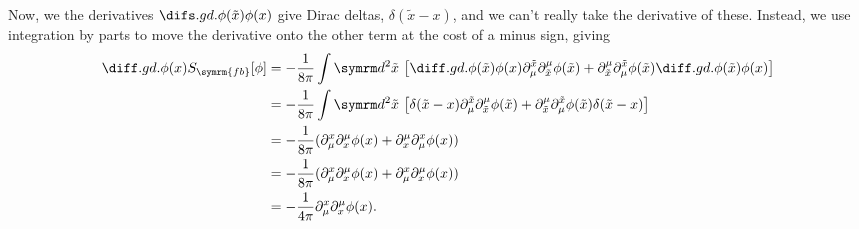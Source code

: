 \documentclass[fleqn]{NotesClass}
\renewcommand{\dl}[1]{\symrm{d}#1}
\newcommand{\freeboson}{\symrm{fb}}
\begin{document}
    Now, we the derivatives \(\difsd{\phi(\tilde{x})}{\phi(x)}\) give Dirac deltas, \(\delta(\tilde{x} - x)\), and we can't really take the derivative of these.
    Instead, we use integration by parts to move the derivative onto the other term at the cost of a minus sign, giving
    \begin{align}
        \diffd{}{\phi(x)} S_{\freeboson}[\phi] &= -\frac{1}{8\pi} \int \dl^2\tilde{x} \, \left[ \diffd{\phi(\tilde{x})}{\phi(x)} \partial_\mu^{\tilde{x}}\partial^\mu_{\tilde{x}}\phi(\tilde{x}) + \partial^\mu_{\tilde{x}} \partial_\mu^{\tilde{x}} \phi(\tilde{x})  \diffd{\phi(\tilde{x})}{\phi(x)} \right]\\
        &= -\frac{1}{8\pi} \int \dl^2\tilde{x} \, \left[ \delta(\tilde{x} - x) \partial_\mu^{\tilde{x}}\partial^\mu_{\tilde{x}}\phi(\tilde{x}) + \partial^\mu_{\tilde{x}} \partial_\mu^{\tilde{x}} \phi(\tilde{x}) \delta(\tilde{x} - x) \right] \notag\\
        &= -\frac{1}{8\pi} (\partial_\mu^{x}\partial^\mu_{x}\phi(x) + \partial^\mu_{x} \partial_\mu^{x} \phi(x))\\
        &= -\frac{1}{8\pi} (\partial_\mu^{x}\partial^\mu_{x}\phi(x) + \partial_\mu^{x} \partial^\mu_{x} \phi(x))\\
        &= -\frac{1}{4\pi} \partial_\mu^x\partial^\mu_x\phi(x).
    \end{align}
    
\end{document}
